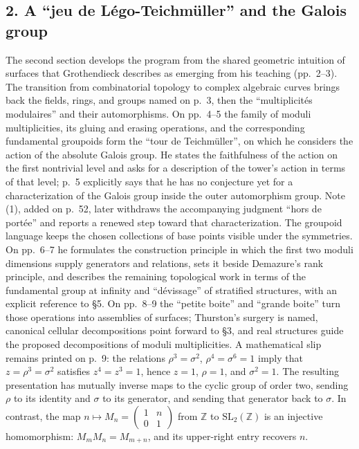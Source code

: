 \subsection*{2. A ``jeu de Légo-Teichmüller'' and the Galois group}
The second section develops the program from the shared geometric
intuition of surfaces that Grothendieck describes as emerging from his
teaching (pp.~2--3). The transition from combinatorial topology to complex
algebraic curves brings back the fields, rings, and groups named on p.~3,
then the ``multiplicités modulaires'' and their automorphisms. On
pp.~4--5 the family of moduli multiplicities, its gluing and erasing
operations, and the corresponding fundamental groupoids form the
``tour de Teichmüller'', on which he considers the action of the absolute
Galois group. He states the faithfulness of the action on the first
nontrivial level and asks for a description of the tower's action in terms
of that level; p.~5 explicitly says that he has no conjecture yet for a
characterization of the Galois group inside the outer automorphism group.
Note (1), added on p.~52, later withdraws the accompanying judgment
``hors de portée'' and reports a renewed step toward that characterization.
The groupoid language keeps the chosen collections of base points visible
under the symmetries. On pp.~6--7 he formulates the construction principle
in which the first two moduli dimensions supply generators and relations,
sets it beside Demazure's rank principle, and describes the remaining
topological work in terms of the fundamental group at infinity and
``dévissage'' of stratified structures, with an explicit reference to
\S5. On pp.~8--9 the ``petite boite'' and ``grande boite'' turn those
operations into assemblies of surfaces; Thurston's surgery is named,
canonical cellular decompositions point forward to \S3, and real
structures guide the proposed decompositions of moduli multiplicities.
A mathematical slip remains printed on p.~9: the relations
$\rho^3=\sigma^2$, $\rho^4=\sigma^6=1$ imply that
$z=\rho^3=\sigma^2$ satisfies $z^4=z^3=1$, hence $z=1$,
$\rho=1$, and $\sigma^2=1$. The resulting presentation has mutually
inverse maps to the cyclic group of order two, sending $\rho$ to its
identity and $\sigma$ to its generator, and sending that generator back
to $\sigma$. In contrast, the map
$n\longmapsto M_n=\left(\begin{smallmatrix}1&n\\0&1\end{smallmatrix}\right)$
from $\mathbb Z$ to $\mathrm{SL}_2(\mathbb Z)$ is an injective
homomorphism: $M_mM_n=M_{m+n}$, and its upper-right entry recovers $n$.
